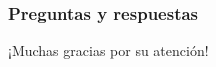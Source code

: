 \fi 


\begin{frame}[t,fragile]
	\frametitle {Preguntas y respuestas}
	
  \begin{block}{}
  	 \centering ¡Muchas gracias por su atención!\\
  \end{block}
		
\end{frame}